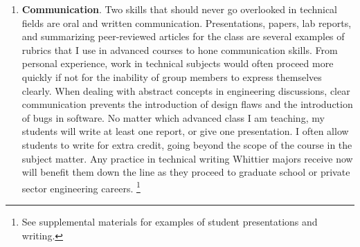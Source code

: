 \documentclass[../../main.tex]{subfiles}
\begin{document}
\begin{enumerate}
\item \textbf{Communication}.  Two skills that should never go overlooked in technical fields are oral and written communication.  Presentations, papers, lab reports, and summarizing peer-reviewed articles for the class are several examples of rubrics that I use in advanced courses to hone communication skills.  From personal experience, work in technical subjects would often proceed more quickly if not for the inability of group members to express themselves clearly.  When dealing with abstract concepts in engineering discussions, clear communication prevents the introduction of design flaws and the introduction of bugs in software. No matter which advanced class I am teaching, my students will write at least one report, or give one presentation.  I often allow students to write for extra credit, going beyond the scope of the course in the subject matter.  Any practice in technical writing Whittier majors receive now will benefit them down the line as they proceed to graduate school or private sector engineering careers. \footnote{See supplemental materials for examples of student presentations and writing.}
\end{enumerate}
\end{document}
